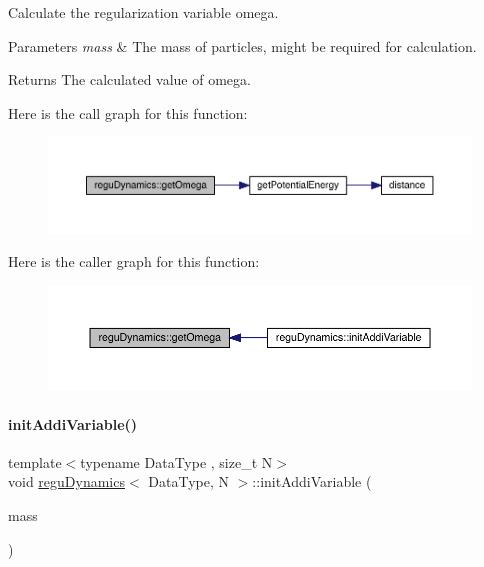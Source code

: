 Calculate the regularization variable omega. 


\begin{DoxyParams}{Parameters}
{\em mass} & The mass of particles, might be required for calculation. \\
\hline
\end{DoxyParams}
\begin{DoxyReturn}{Returns}
The calculated value of omega. 
\end{DoxyReturn}
Here is the call graph for this function\+:\nopagebreak
\begin{figure}[H]
\begin{center}
\leavevmode
\includegraphics[width=350pt]{classregu_dynamics_a0fe3b4f9a468687ec1f004120b347ddd_cgraph}
\end{center}
\end{figure}
Here is the caller graph for this function\+:\nopagebreak
\begin{figure}[H]
\begin{center}
\leavevmode
\includegraphics[width=350pt]{classregu_dynamics_a0fe3b4f9a468687ec1f004120b347ddd_icgraph}
\end{center}
\end{figure}
\mbox{\label{classregu_dynamics_aa42158ddf3c5385aa89988b9bb80ff29}} 
\paragraph{\texorpdfstring{init\+Addi\+Variable()}{initAddiVariable()}}
{\footnotesize\ttfamily template$<$typename Data\+Type , size\+\_\+t N$>$ \\
void \mbox{\hyperlink{classregu_dynamics}{regu\+Dynamics}}$<$ Data\+Type, N $>$\+::init\+Addi\+Variable (\begin{DoxyParamCaption}\item[{\mbox{\hyperlink{classregu_dynamics_a34b4b77ea3e49e1cdef584ec8bd281dc}{Scalar\+Array}} \&}]{mass }\end{DoxyParamCaption})\hspace{0.3cm}{\ttfamily [inline]}}



